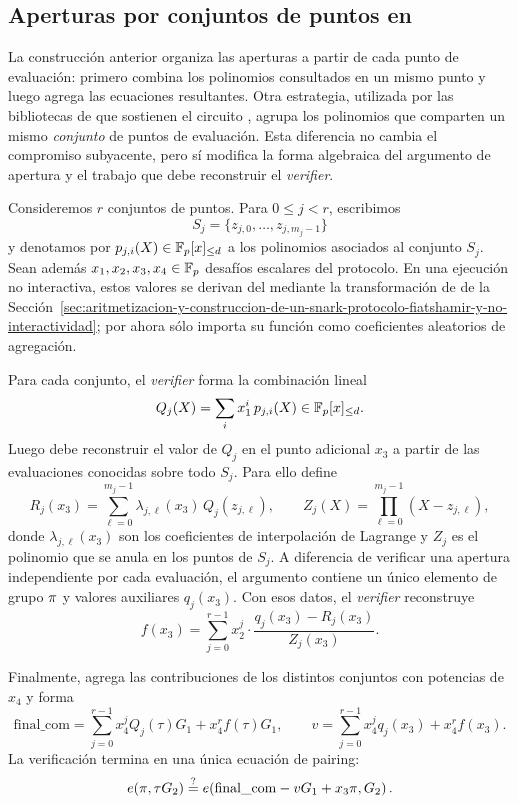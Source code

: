 \subsection{Aperturas por conjuntos de puntos en \texorpdfstring{\HaloTwoMultiOpen}{Halo2 Multi-Open}}
\label{subsec:kzg-halo2-multiopen}

La construcción anterior organiza las aperturas a partir de cada punto de evaluación: primero combina los polinomios consultados en un mismo punto y luego agrega las ecuaciones resultantes. Otra estrategia, utilizada por las bibliotecas de \Midnight que sostienen el circuito \MidnightSTMCircuit \cite{MithrilSTMRepo}, agrupa los polinomios que comparten un mismo \emph{conjunto} de puntos de evaluación. Esta diferencia no cambia el compromiso \KZG subyacente, pero sí modifica la forma algebraica del argumento de apertura y el trabajo que debe reconstruir el \textit{verifier}.

Consideremos $r$ conjuntos de puntos. Para $0 \leq j < r$, escribimos
$$S_j=\{z_{j,0},\ldots,z_{j,m_j-1}\}$$
y denotamos por $p_{j,i}(X) \in \mathbb{F}_p[x]_{\leq d}$ a los polinomios asociados al conjunto $S_j$. Sean además $x_1,x_2,x_3,x_4 \in \mathbb{F}_p$ desafíos escalares del protocolo. En una ejecución no interactiva, estos valores se derivan del \transcript mediante la transformación de \FiatShamir de la Sección~\ref{sec:aritmetizacion-y-construccion-de-un-snark-protocolo-fiatshamir-y-no-interactividad}; por ahora sólo importa su función como coeficientes aleatorios de agregación.

Para cada conjunto, el \textit{verifier} forma la combinación lineal
$$Q_j(X)=\sum_i x_1^i\,p_{j,i}(X) \in \mathbb{F}_p[x]_{\leq d}.$$
Luego debe reconstruir el valor de $Q_j$ en el punto adicional $x_3$ a partir de las evaluaciones conocidas sobre todo $S_j$. Para ello define
$$R_j(x_3) = \sum_{\ell = 0}^{m_j - 1}\lambda_{j,\ell}(x_3) \, Q_j(z_{j, \ell}), \qquad Z_j(X) = \prod_{\ell = 0}^{m_j - 1}(X - z_{j, \ell}),$$
donde $\lambda_{j,\ell}(x_3)$ son los coeficientes de interpolación de Lagrange y $Z_j$ es el polinomio que se anula en los puntos de $S_j$. A diferencia de verificar una apertura \KZG independiente por cada evaluación, el argumento contiene un único elemento de grupo $\pi$ y valores auxiliares $q_j(x_3)$. Con esos datos, el \textit{verifier} reconstruye
$$f(x_3) = \sum_{j=0}^{r-1} x_2^j\cdot \frac{q_j(x_3)-R_j(x_3)}{Z_j(x_3)}.$$

Finalmente, agrega las contribuciones de los distintos conjuntos con potencias de $x_4$ y forma
$$\mathrm{final\_com}=\sum_{j=0}^{r-1}x_4^j Q_j(\tau)G_1+x_4^{r}f(\tau)G_1, \qquad v = \sum_{j=0}^{r-1}x_4^j q_j(x_3)+x_4^{r}f(x_3).$$
La verificación termina en una única ecuación de pairing:
$$e\!\left(\pi,\tau G_2\right) \stackrel{?}{=} e\!\left(\mathrm{final\_com} - vG_1 + x_3\pi,G_2\right).$$

